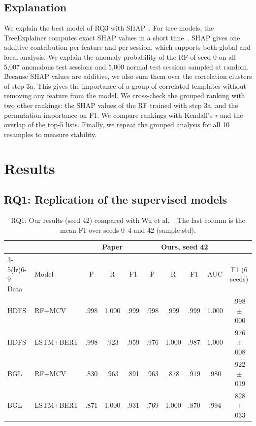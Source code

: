 \documentclass[10pt, conference]{IEEEtran}
\begin{document}
\subsection{Explanation}

We explain the best model of RQ3 with SHAP~\cite{lundberg2017unified}. For tree models, the TreeExplainer computes exact SHAP values in a short time~\cite{lundberg2020local}. SHAP gives one additive contribution per feature and per session, which supports both global and local analysis. We explain the anomaly probability of the RF of seed 0 on all 5,007 anomalous test sessions and 5,000 normal test sessions sampled at random. Because SHAP values are additive, we also sum them over the correlation clusters of step 3a. This gives the importance of a group of correlated templates without removing any feature from the model. We cross-check the grouped ranking with two other rankings: the SHAP values of the RF trained with step 3a, and the permutation importance on F1. We compare rankings with Kendall's $\tau$ and the overlap of the top-5 lists. Finally, we repeat the grouped analysis for all 10 resamples to measure stability.

\section{Results}
\label{sec:results}

\subsection{RQ1: Replication of the supervised models}
\label{sec:rq1}

\begin{table}[t]
\centering
\caption{RQ1: Our results (seed 42) compared with Wu et al.~\cite{wu2023effectiveness}. The last column is the mean F1 over seeds 0--4 and 42 (sample std).}
\label{tab:rq1}
\footnotesize
\setlength{\tabcolsep}{1.7pt}
\begin{tabular}{llcccccccc}
\toprule
 & & \multicolumn{3}{c}{Paper} & \multicolumn{4}{c}{Ours, seed 42} & \\
\cmidrule(lr){3-5}\cmidrule(lr){6-9}
Data & Model & P & R & F1 & P & R & F1 & AUC & F1 (6 seeds) \\
\midrule
HDFS & RF+MCV & .998 & 1.000 & .999 & .998 & .999 & .999 & 1.000 & .998 $\pm$ .000 \\
HDFS & LSTM+BERT & .998 & .923 & .959 & .976 & 1.000 & .987 & 1.000 & .976 $\pm$ .008 \\
BGL & RF+MCV & .830 & .963 & .891 & .963 & .878 & .919 & .980 & .922 $\pm$ .019 \\
BGL & LSTM+BERT & .871 & 1.000 & .931 & .769 & 1.000 & .870 & .994 & .828 $\pm$ .033 \\
\bottomrule
\end{tabular}
\end{table}
\end{document}

